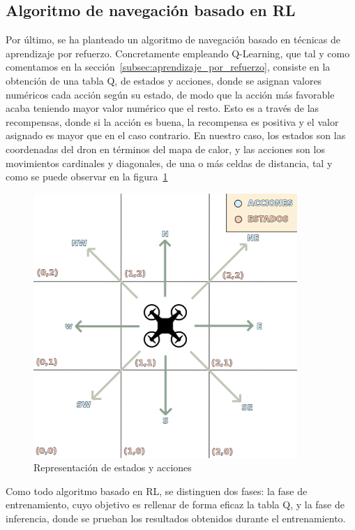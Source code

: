\subsection{Algoritmo de navegación basado en \ac{RL}}
\label{subsec:alg-q}

Por último, se ha planteado un algoritmo de navegación basado en técnicas de aprendizaje por refuerzo. Concretamente empleando Q-Learning, que tal y como comentamos en la sección~\ref{subsec:aprendizaje_por_refuerzo}, consiste en la obtención de una tabla Q, de estados y acciones, donde se asignan valores numéricos cada acción según su estado, de modo que la acción más favorable acaba teniendo mayor valor numérico que el resto. Esto es a través de las recompensas, donde si la acción es buena, la recompensa es positiva y el valor asignado es mayor que en el caso contrario. En nuestro caso, los estados son las coordenadas del dron en términos del mapa de calor, y las acciones son los movimientos cardinales y diagonales, de una o más celdas de distancia, tal y como se puede observar en la figura~\ref{fig:expl_q}\\

\begin{figure} [tp]
    \begin{center}
    \includegraphics[height=10cm]{imagenes/cap4/6_act_st.png}
    \end{center}
    \caption[Representación de estados y acciones]{Representación de estados y acciones}
    \label{fig:expl_q}
\end{figure}

Como todo algoritmo basado en \ac{RL}, se distinguen dos fases: la fase de entrenamiento, cuyo objetivo es rellenar de forma eficaz la tabla Q, y la fase de inferencia, donde se prueban los resultados obtenidos durante el entrenamiento.\\

